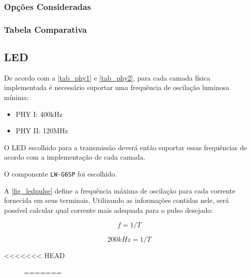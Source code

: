 \begin{table}[h!]
	
	\subsubsection{Opções Consideradas}\label{uc-options}
	
	\lipsum[14]
	
	\subsubsection{Tabela Comparativa}\label{uc-table}
	
	\lipsum[15]
	
	\subsection{LED}\label{hard-led}
	
	De acordo com a \autoref{tab_phy1} e \autoref{tab_phy2}, para cada camada física implementada é necessário suportar uma frequência de oscilação luminosa mínima:
	
	\begin{itemize}
		\item PHY I: 400kHz
		\item PHY II: 120MHz
	\end{itemize} 
	
	O LED escolhido para a transmissão deverá então suportar essas frequências de acordo com a implementação de cada camada. 
	
	O componente \texttt{LW-G6SP} foi escolhido.
	
	A \autoref{fig_ledpulse} define a frequência máxima de oscilação para cada corrente fornecida em seus terminais. Utilizando as informações contidas nele, será possível calcular qual corrente mais adequada para o pulso desejado:
	
	\begin{equation} \label{eq:5}
		f = 1 / T
	\end{equation}
	
	\begin{equation}
	200kHz = 1 / T
	\end{equation}
	
<<<<<<< HEAD
	\begin{figure}[htb]
=======
	
	
	

\end{figure}
\end{table}
